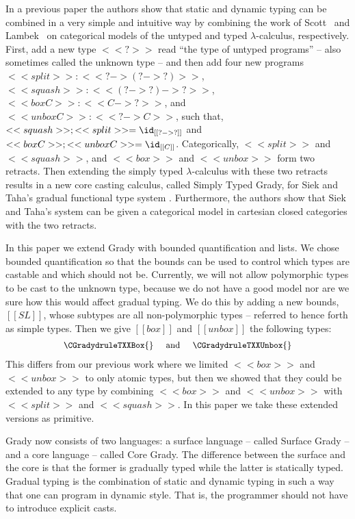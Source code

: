 In a previous paper the authors \cite{Eades:2017} show that
static and dynamic typing can be combined in a very simple and
intuitive way by combining the work of Scott~\cite{Scott:1980} and
Lambek~\cite{Lambek:1980} on categorical models of the untyped and
typed $\lambda$-calculus, respectively.  First, add a new type $<<?>>$
read ``the type of untyped programs'' -- also sometimes called the
unknown type -- and then add four new programs
$<<split>> : <<? -> (? -> ?)>>$, $ <<squash>> : <<(? -> ?) -> ?>> $,
$<<box C>> : <<C -> ?>>$, and $<<unbox C>> : <<? -> C>>$, such that,
$<<squash>>;<<split>> = \id_{[[? -> ?]]}$ and
$<<box C>>;<<unbox C>> = \id_{[[C]]}$.
Categorically, $<<split>>$ and $<<squash>>$, and $<<box>>$ and
$<<unbox>>$ form two retracts.  Then extending the simply typed
$\lambda$-calculus with these two retracts results in a new core
casting calculus, called Simply Typed Grady, for Siek and Taha's
gradual functional type system \cite{Siek:2015}.  Furthermore, the
authors show that Siek and Taha's system can be given a categorical
model in cartesian closed categories with the two retracts.

In this paper we extend Grady with bounded quantification and lists.
We chose bounded quantification so that the bounds can be used to
control which types are castable and which should not be.  Currently,
we will not allow polymorphic types to be cast to the unknown type,
because we do not have a good model nor are we sure how this would
affect gradual typing.  We do this by adding a new bounds, $[[SL]]$,
whose subtypes are all non-polymorphic types -- referred to hence
forth as simple types.  Then we give $[[box]]$ and $[[unbox]]$ the
following types:
\[\small
\begin{array}{lll}
  \CGradydruleTXXBox{} & \text{ and } & \CGradydruleTXXUnbox{}
\end{array}
\]
This differs from our previous work where we limited $<<box>>$ and
$<<unbox>>$ to only atomic types, but then we showed that they could
be extended to any type by combining $<<box>>$ and $<<unbox>>$ with
$<<split>>$ and $<<squash>>$.  In this paper we take these extended
versions as primitive.

Grady now consists of two languages: a surface language -- called
Surface Grady -- and a core language -- called Core Grady. The
difference between the surface and the core is that the former is
gradually typed while the latter is statically typed. Gradual typing
is the combination of static and dynamic typing in such a way that one
can program in dynamic style.  That is, the programmer should not have
to introduce explicit casts.

